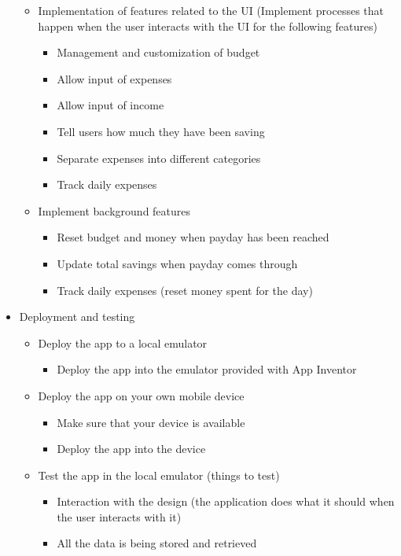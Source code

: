 \begin{itemize}
\begin{itemize}
    \item Implementation of features related to the UI (Implement processes that happen when the user interacts with the UI for the following features)
    \begin{itemize}
      \item Management and customization of budget
      \item Allow input of expenses
      \item Allow input of income
      \item Tell users how much they have been saving
      \item Separate expenses into different categories
      \item Track daily expenses
    \end{itemize}
    \item Implement background features
    \begin{itemize}
      \item Reset budget and money when payday has been reached
      \item Update total savings when payday comes through
      \item Track daily expenses (reset money spent for the day)
    \end{itemize}
  \end{itemize}
  \item Deployment and testing
  \begin{itemize}
    \item Deploy the app to a local emulator
    \begin{itemize}
      \item Deploy the app into the emulator provided with App Inventor
    \end{itemize}
    \item Deploy the app on your own mobile device
    \begin{itemize}
      \item Make sure that your device is available
      \item Deploy the app into the device
    \end{itemize}
    \item Test the app in the local emulator (things to test)
    \begin{itemize}
      \item Interaction with the design (the application does what it should when the user interacts with it)
      \item All the data is being stored and retrieved

\end{itemize}
\end{itemize}
\end{itemize}
